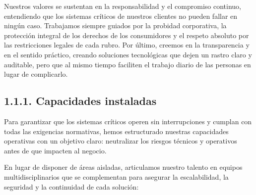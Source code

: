 \documentclass[11pt]{article}
\begin{document}
Nuestros valores se sustentan en la responsabilidad y el compromiso continuo, entendiendo que los sistemas críticos de nuestros clientes no pueden fallar en ningún caso. Trabajamos siempre guiados por la probidad corporativa, la protección integral de los derechos de los consumidores y el respeto absoluto por las restricciones legales de cada rubro. Por último, creemos en la transparencia y en el sentido práctico, creando soluciones tecnológicas que dejen un rastro claro y auditable, pero que al mismo tiempo faciliten el trabajo diario de las personas en lugar de complicarlo.

\subsection{1.1.1. Capacidades instaladas}\label{capacidades-instaladas}

Para garantizar que los sistemas críticos operen sin interrupciones y cumplan con todas las exigencias normativas, hemos estructurado nuestras capacidades operativas con un objetivo claro: neutralizar los riesgos técnicos y operativos antes de que impacten al negocio.

En lugar de disponer de áreas aisladas, articulamos nuestro talento en equipos multidisciplinarios que se complementan para asegurar la escalabilidad, la seguridad y la continuidad de cada solución:
\end{document}
